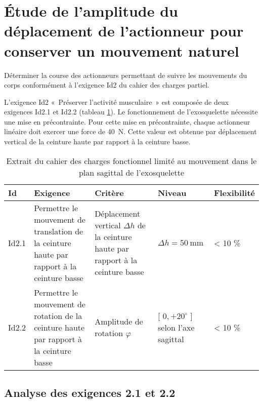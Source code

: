 
\section{Étude de l'amplitude du déplacement de l'actionneur pour conserver un mouvement naturel} %
\begin{obj}
Déterminer la course des actionneurs permettant de suivre les mouvements du corps conformément à l'exigence Id2 du cahier des charges partiel.
\end{obj}


L'exigence Id2 «~Préserver l'activité musculaire~» est composée de deux exigences Id2.1 et Id2.2 (tableau \ref{ccs_mp_2023_tab_02}). Le fonctionnement de l'exosquelette nécessite une mise en précontrainte. Pour cette mise en précontrainte, chaque actionneur linéaire doit exercer une force de \SI{40}{N}. Cette valeur est obtenue par déplacement vertical de la ceinture haute par rapport à la ceinture basse.

\begin{table}[h]
\begin{center}
\begin{tabular}{|l|p{4cm}|p{4cm}|l|l|}
\hline
Id & Exigence & Critère & Niveau & Flexibilité \\
\hline
Id2.1 & Permettre le mouvement de translation de la ceinture haute par rapport à la ceinture basse & Déplacement vertical $\Delta h$ de la ceinture haute par rapport à la ceinture basse & $\Delta h=50 \mathrm{~mm}$ & < 10 \% \\
\hline
Id2.2 & Permettre le mouvement de rotation de la ceinture haute par rapport à la ceinture basse & Amplitude de rotation $\varphi$ & [ $0,+20^{\circ}$ ] selon l'axe sagittal & < 10 \% \\
\hline
\end{tabular}
\caption{\label{ccs_mp_2023_tab_02}Extrait du cahier des charges fonctionnel limité au mouvement dans le plan sagittal de l'exosquelette}
\end{center}
\end{table}

\subsection{Analyse des exigences 2.1 et 2.2} %

